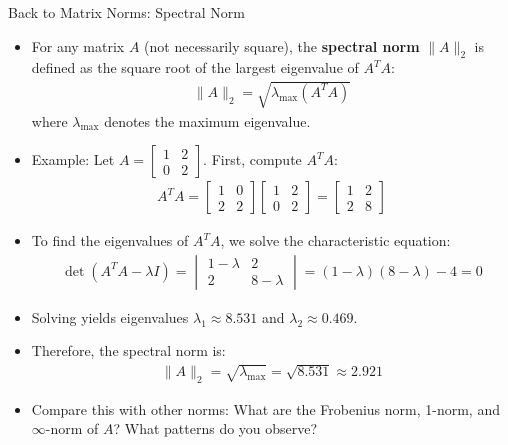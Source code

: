 \begin{frame}{Back to Matrix Norms: Spectral Norm}
\begin{itemize}
    \item For any matrix $A$ (not necessarily square), the \textbf{spectral norm} $\|A\|_2$ is defined as the square root of the largest eigenvalue of $A^TA$:
        \begin{align}
            \|A\|_2 = \sqrt{\lambda_{\max}(A^T A)}
        \end{align}
    where $\lambda_{\max}$ denotes the maximum eigenvalue.
    \item Example: Let $A = \begin{bmatrix} 1 & 2 \\ 0 & 2 \end{bmatrix}$. First, compute $A^TA$:
        \begin{align}
            A^T A = 
        \begin{bmatrix} 
        1 & 0 \\ 
        2 & 2 
        \end{bmatrix}
        \begin{bmatrix} 
        1 & 2 \\ 
        0 & 2 
        \end{bmatrix}
        =
        \begin{bmatrix}
        1 & 2 \\
        2 & 8
        \end{bmatrix}
        \end{align}
\end{itemize}
\end{frame}

\begin{frame}{}
\begin{itemize}
    \item To find the eigenvalues of $A^TA$, we solve the characteristic equation:
    \begin{align}
        \det(A^T A - \lambda I) = 
    \begin{vmatrix}
    1 - \lambda & 2 \\
    2 & 8 - \lambda
    \end{vmatrix}
    = (1 - \lambda)(8 - \lambda) - 4 = 0
    \end{align}
\item Solving yields eigenvalues $\lambda_1 \approx 8.531$ and $\lambda_2 \approx 0.469$.
\item Therefore, the spectral norm is:
\begin{align}
    \|A\|_2 = \sqrt{\lambda_{\max}} = \sqrt{8.531} \approx 2.921
\end{align}
\item Compare this with other norms: What are the Frobenius norm, 1-norm, and $\infty$-norm of $A$? What patterns do you observe?
\end{itemize}
\end{frame}



